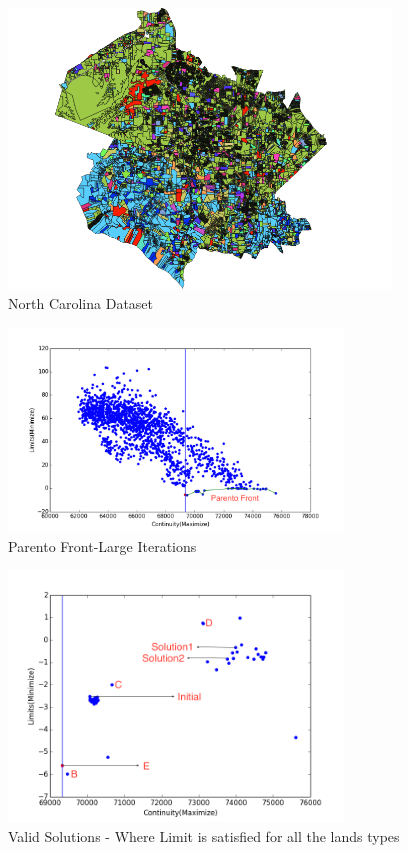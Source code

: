 \documentclass{sig-alternate}
\begin{document}
\begin{figure}[h]
\begin{center}
\includegraphics[width=4in]{nc.png}
\caption{North Carolina Dataset}
\end{center}
\end{figure}


\begin{figure}[h]
\begin{center}
\includegraphics[width=3.5in]{Solutions.png}
\caption{Parento Front-Large Iterations}
\end{center}
\end{figure}
\begin{figure}[h]
\begin{center}
\includegraphics[width=3.5in]{ValidSolutions.png}
\caption{Valid Solutions -  Where Limit is satisfied for all the lands types}
\end{center}
\end{figure}
\end{document}
